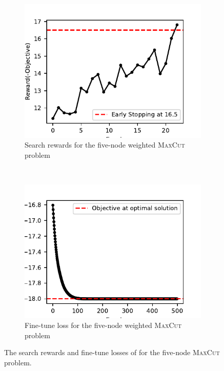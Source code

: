 \documentclass[a4paper,onecolumn,11pt]{quantumarticle}
\begin{document}
\begin{figure}[H]
    \centering
    \begin{subfigure}[b]{0.46\linewidth}
        \includegraphics[width=\linewidth]{Figures/fig_qaoa_5q_1_search_rewards.pdf}
        \caption{Search rewards for the five-node weighted \textsc{MaxCut} problem}
        \label{fig:qaoa_5q_search}
    \end{subfigure}
    ~ %
    \begin{subfigure}[b]{0.48\linewidth}
        \includegraphics[width=\linewidth]{Figures/fig_qaoa_5q_1_fine_tune_loss.pdf}
        \caption{Fine-tune loss for the five-node weighted \textsc{MaxCut} problem}
        \label{fig:qaoa_5q_finetune}
    \end{subfigure}
    \caption{The search rewards and fine-tune losses of for the five-node \textsc{MaxCut} problem.}\label{fig:qaoa_5q_search_and_finetune}
\end{figure}
\end{document}
